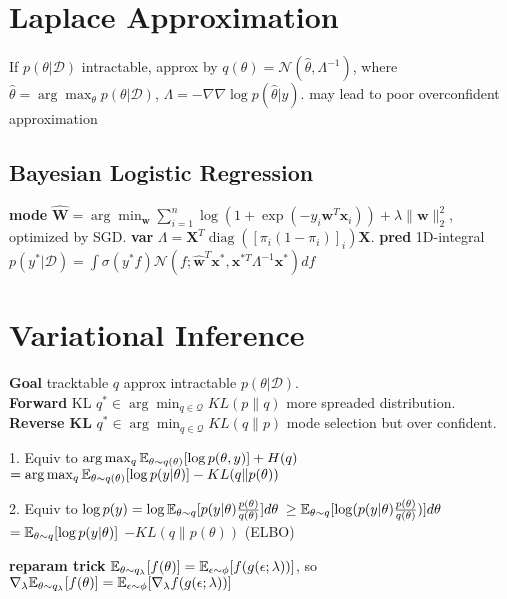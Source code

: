 \section{Laplace Approximation}
If $p(\theta|\mathcal{D})$ intractable, approx by $q(\theta)=\mathcal{N}(\hat{\theta}, \Lambda^{-1})$, where $\hat{\theta}=\arg \max _\theta p(\theta |\mathcal{D})$, $\Lambda=-\nabla \nabla \log p(\hat{\theta} | y)$. 
 may lead to poor overconfident approximation
 \subsection{Bayesian Logistic Regression}
\textbf{mode} $\hat{\mathbf{W}}=\arg \min _{\mathbf{w}} \sum_{i=1}^n \log (1+\exp (-y_i \mathbf{w}^T \mathbf{x}_i))+\lambda\|\mathbf{w}\|_2^2$, optimized by SGD. 
\textbf{var} $\Lambda = \mathbf{X}^T \operatorname{diag}([\pi_i(1-\pi_i)]_i) \mathbf{X}$.
\textbf{pred} 1D-integral $p(y^* | \mathcal{D} ) = \int \sigma(y^* f) \mathcal{N}(f ; \hat{\mathbf{w}}^T \mathbf{x}^*, \mathbf{x}^{* T} \Lambda^{-1} \mathbf{x}^*) d f$

\section{Variational Inference}
\textbf{Goal} tracktable $q$ approx intractable $p(\theta|\mathcal{D})$. \\
\textbf{Forward} KL $q^* \in \arg \min _{q \in \mathcal{Q}} K L(p \| q)$ more spreaded distribution. \\
\textbf{Reverse KL} $q^* \in \arg \min _{q \in \mathcal{Q}} K L(q \| p)$ mode selection but over confident. 

1. Equiv to $\arg \max _q \mathbb{E}_{\theta {\small \sim} q(\theta)}[\log p(\theta, y)]+H(q)$ $=\arg \max _q \mathbb{E}_{\theta {\small \sim} q(\theta)}[\log p(y | \theta)]-K L(q \| p(\theta))$

2. Equiv to  $\log p(y)=\log \mathbb{E}_{\theta {\small \sim} q}[p(y | \theta) \frac{p(\theta)}{q(\theta)}] d \theta$ $\geq \mathbb{E}_{\theta {\small \sim} q}[\log (p(y | \theta) \frac{p(\theta)}{q(\theta)})] d \theta$ $=\mathbb{E}_{\theta {\small \sim} q}[\log p(y | \theta)]$ $- K L(q \| p(\theta))$ (ELBO)

\textbf{reparam trick} $\mathbb{E}_{\theta {\small \sim} q_\lambda}[f(\theta)]=\mathbb{E}_{\epsilon {\small \sim} \phi}[f(g(\epsilon ; \lambda))]$, so $\nabla_\lambda \mathbb{E}_{\theta {\small \sim} q_\lambda}[f(\theta)]=\mathbb{E}_{\epsilon {\small \sim} \phi}[\nabla_\lambda f(g(\epsilon ; \lambda))]$

